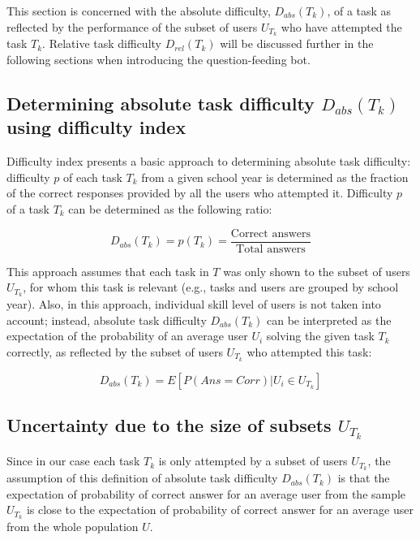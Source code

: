 This section is concerned with the absolute difficulty, $D_{abs}(T_k)$, of a task as reflected by the performance of the subset of users $U_{T_k}$ who have attempted the task $T_k$.
Relative task difficulty $D_{rel}(T_k)$ will be discussed further in the following sections when introducing the question-feeding bot.

\subsection{Determining absolute task difficulty $D_{abs}(T_k)$ using difficulty index} \label{subsec:q1_difficulty_index}

Difficulty index presents a basic approach to determining absolute task difficulty: difficulty $p$ of each task $T_k$ from a given school year is determined as the fraction of the correct responses provided by all the users who attempted it.
Difficulty $p$ of a task $T_k$ can be determined as the following ratio:

\begin{equation}
    \label{eq:task_difficulty}
    D_{abs}(T_k) = p(T_k) = \frac{\text{Correct answers}} {\text{Total answers}}
\end{equation}

This approach assumes that each task in $T$ was only shown to the subset of users $U_{T_k}$, for whom this task is relevant (e.g., tasks and users are grouped by school year).
Also, in this approach, individual skill level of users is not taken into account;
instead, absolute task difficulty $D_{abs}(T_k)$ can be interpreted as the expectation of the probability of an average user $U_i$ solving the given task $T_k$ correctly, as reflected by the subset of users $U_{T_k}$ who attempted this task:

\begin{equation}
    D_{abs}(T_k) = E[P(Ans=Corr)|U_i \in U_{T_k}]
\end{equation}

\subsection{Uncertainty due to the size of subsets $U_{T_k}$} \label{subsec:q1_dabs_uncertainty}

Since in our case each task $T_k$ is only attempted by a subset of users $U_{T_k}$, the assumption of this definition of absolute task difficulty $D_{abs}(T_k)$ is that the expectation of probability of correct answer for an average user from the sample $U_{T_k}$ is close to the expectation of probability of correct answer for an average user from the whole population $U$.

